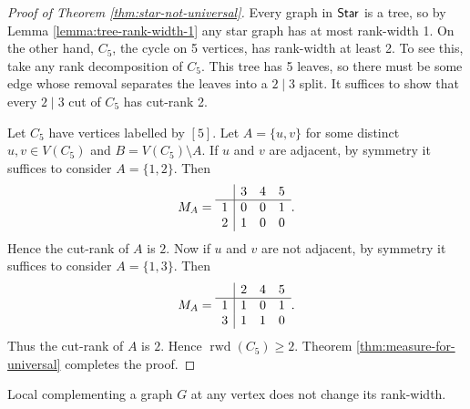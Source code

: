 \begin{proof}[Proof of Theorem \ref{thm:star-not-universal}]
Every graph in $\mathsf{Star}$ is a tree, so by Lemma \ref{lemma:tree-rank-width-1} any star graph has at most rank-width 1. On the other hand, $C_5$, the cycle on 5 vertices, has rank-width at least 2. To see this, take any rank decomposition of $C_5$. This tree has 5 leaves, so there must be some edge whose removal separates the leaves into a $2 \mid 3$ split. It suffices to show that every $2 \mid 3$ cut of $C_5$ has cut-rank 2.

Let $C_5$ have vertices labelled by $[5]$. Let $A = \{u,v\}$ for some distinct $u,v \in V(C_5)$ and $B = V(C_5) \setminus A$. If $u$ and $v$ are adjacent, by symmetry it suffices to consider $A = \{1,2\}$. Then
\begin{align}
    M_A = \begin{array}{c|c c c}
        & 3 & 4 & 5 \\
        \hline 
        1 & 0 & 0 & 1 \\
        2 & 1 & 0 & 0
    \end{array}.
\end{align}
Hence the cut-rank of $A$ is $2$. Now if $u$ and $v$ are not adjacent, by symmetry it suffices to consider $A = \{1,3\}$. Then 
\begin{align}
    M_A = \begin{array}{c|c c c}
        & 2 & 4 & 5 \\
        \hline 
        1 & 1 & 0 & 1 \\
        3 & 1 & 1 & 0
    \end{array}.
\end{align}
Thus the cut-rank of $A$ is $2$. Hence $\operatorname{rwd}(C_5) \geq 2$. Theorem \ref{thm:measure-for-universal} completes the proof.
\end{proof}

\begin{theorem}
\label{thm:local-complementation-preserves-rank-width}
Local complementing a graph $G$ at any vertex does not change its rank-width.
\end{theorem}


